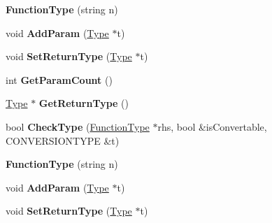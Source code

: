 \begin{DoxyCompactItemize}
\item 
\hypertarget{classFunctionType_a924981ea6fc18a7a9ed4cb5c94a136d6}{{\bfseries Function\-Type} (string n)}\label{classFunctionType_a924981ea6fc18a7a9ed4cb5c94a136d6}

\item 
\hypertarget{classFunctionType_a9259c94250b6cb903c6013bc10a0b7bc}{void {\bfseries Add\-Param} (\hyperlink{classType}{Type} $\ast$t)}\label{classFunctionType_a9259c94250b6cb903c6013bc10a0b7bc}

\item 
\hypertarget{classFunctionType_a1462775c5732b70b07c689ab7088814d}{void {\bfseries Set\-Return\-Type} (\hyperlink{classType}{Type} $\ast$t)}\label{classFunctionType_a1462775c5732b70b07c689ab7088814d}

\item 
\hypertarget{classFunctionType_a8b6fed7ff4d79b5db3d39cd042326090}{int {\bfseries Get\-Param\-Count} ()}\label{classFunctionType_a8b6fed7ff4d79b5db3d39cd042326090}

\item 
\hypertarget{classFunctionType_a601e763553086c0d7a4c2de97d6de2bc}{\hyperlink{classType}{Type} $\ast$ {\bfseries Get\-Return\-Type} ()}\label{classFunctionType_a601e763553086c0d7a4c2de97d6de2bc}

\item 
\hypertarget{classFunctionType_a150840d05c02a26ca776aad22e0deed1}{bool {\bfseries Check\-Type} (\hyperlink{classFunctionType}{Function\-Type} $\ast$rhs, bool \&is\-Convertable, C\-O\-N\-V\-E\-R\-S\-I\-O\-N\-T\-Y\-P\-E \&t)}\label{classFunctionType_a150840d05c02a26ca776aad22e0deed1}

\item 
\hypertarget{classFunctionType_a924981ea6fc18a7a9ed4cb5c94a136d6}{{\bfseries Function\-Type} (string n)}\label{classFunctionType_a924981ea6fc18a7a9ed4cb5c94a136d6}

\item 
\hypertarget{classFunctionType_a9259c94250b6cb903c6013bc10a0b7bc}{void {\bfseries Add\-Param} (\hyperlink{classType}{Type} $\ast$t)}\label{classFunctionType_a9259c94250b6cb903c6013bc10a0b7bc}

\item 
\hypertarget{classFunctionType_a1462775c5732b70b07c689ab7088814d}{void {\bfseries Set\-Return\-Type} (\hyperlink{classType}{Type} $\ast$t)}\label{classFunctionType_a1462775c5732b70b07c689ab7088814d}


\end{DoxyCompactItemize}
